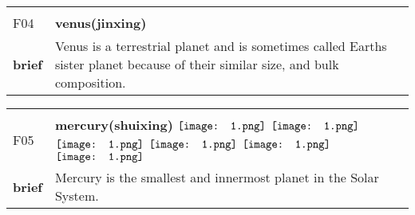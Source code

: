 \documentclass[UTF8]{article}
\begin{document}
            \begin{tabularx}{\textwidth}{p{1.5cm}X}
            \arrayrulecolor{myBlue}
        	\hline\\
            \small{F04}&
            \large{\bfseries{venus(jinxing)}}\hfill
                                                            \phantom{$\vcenter{\hbox{\texttt{[image: 1.png]}}}$}
                                                                \phantom{$\vcenter{\hbox{\texttt{[image: 1.png]}}}$}
                                                                \phantom{$\vcenter{\hbox{\texttt{[image: 1.png]}}}$}
                                                                \phantom{$\vcenter{\hbox{\texttt{[image: 1.png]}}}$}
                                                                \phantom{$\vcenter{\hbox{\texttt{[image: 1.png]}}}$}
                                                                \phantom{$\vcenter{\hbox{\texttt{[image: 1.png]}}}$}
                                                                \phantom{$\vcenter{\hbox{\texttt{[image: 1.png]}}}$}
                                        \\[10pt]
            \large{\bfseries{brief}}&\noindent\parbox[c]{\hsize}{Venus is a terrestrial planet and is sometimes called Earths sister planet because of their similar size, and bulk composition.} \\[5pt]
            \hline\\[-10pt]
        \end{tabularx}
            \begin{tabularx}{\textwidth}{p{1.5cm}X}
            \arrayrulecolor{myBlue}
        	\hline\\
            \small{F05}&
            \large{\bfseries{mercury(shuixing)}}\hfill
                                                            $\vcenter{\hbox{\texttt{[image: 1.png]}}}$
                                                                \phantom{$\vcenter{\hbox{\texttt{[image: 1.png]}}}$}
                                                                $\vcenter{\hbox{\texttt{[image: 1.png]}}}$
                                                                $\vcenter{\hbox{\texttt{[image: 1.png]}}}$
                                                                $\vcenter{\hbox{\texttt{[image: 1.png]}}}$
                                                                $\vcenter{\hbox{\texttt{[image: 1.png]}}}$
                                                                $\vcenter{\hbox{\texttt{[image: 1.png]}}}$
                                        \\[10pt]
            \large{\bfseries{brief}}&\noindent\parbox[c]{\hsize}{Mercury is the smallest and innermost planet in the Solar System.} \\[5pt]
            \hline\\[-10pt]
        \end{tabularx}
\end{document}
